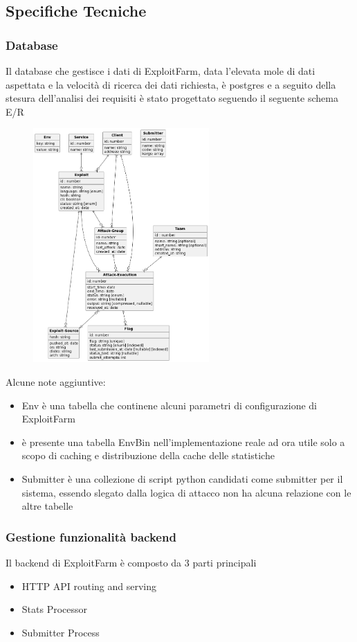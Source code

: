 \documentclass[11pt]{article}
\begin{document}
\subsection{Specifiche Tecniche}
\subsubsection{Database}
Il database che gestisce i dati di ExploitFarm, data l'elevata mole di dati aspettata e la velocità di ricerca dei dati richiesta, è postgres e a seguito della stesura dell'analisi dei requisiti è stato progettato seguendo il seguente schema E/R
    \begin{figure}[H]
    	\centering
    	\includegraphics[width=0.6\textwidth]{ExploitFarmDB.png}
	\end{figure}
	Alcune note aggiuntive:
	\begin{itemize}
		\item Env è una tabella che continene alcuni parametri di configurazione di ExploitFarm
		\item è presente una tabella EnvBin nell'implementazione reale ad ora utile solo a scopo di caching e distribuzione della cache delle statistiche
		\item Submitter è una collezione di script python candidati come submitter per il sistema, essendo slegato dalla logica di attacco non ha alcuna relazione con le altre tabelle
	\end{itemize}
\subsubsection{Gestione funzionalità backend}
Il backend di ExploitFarm è composto da 3 parti principali
\begin{itemize}
	\item HTTP API routing and serving
	\item Stats Processor
	\item Submitter Process
\end{itemize}
\end{document}
